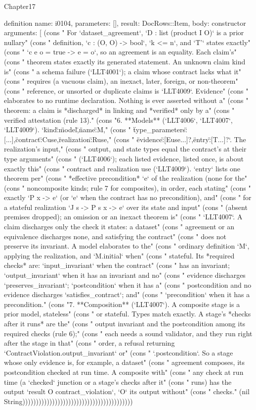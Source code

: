 \begin{lexlean}{Chapter17}
\begin{semanticmodule}
definition{
  name: i0104,
  parameters: [],
  result: DocRows::Item,
  body: constructor{
    arguments: [
      (cons "   For `dataset_agreement`, `D : list (product I O)` is a prior nullary" (cons "   definition, `c : (O, O) -> bool`, `k <= n`, and `T'` states exactly" (cons "   `c e o = true -> e = o`, so an agreement is an equality. Each claim's" (cons "   theorem states exactly its generated statement. An unknown claim kind is" (cons "   a schema failure (`LLT4001`); a claim whose contract lacks what it" (cons "   requires (a vacuous claim), an inexact, later, foreign, or non-theorem" (cons "   reference, or unsorted or duplicate claims is `LLT4009`. Evidence" (cons "   elaborates to no runtime declaration. Nothing is ever asserted without a" (cons "   theorem: a claim is *discharged* in linking and *verified* only by a" (cons "   verified attestation (rule 13)." (cons "6. **Models** (`LLT4006`, `LLT4007`, `LLT4009`). `{\"kind\":\"model\",\"name\":M," (cons "   \"type_parameters\":[...],\"contract\":Cuse,\"realization\":Ruse," (cons "   \"evidence\":[Euse...]?,\"entry\":[T...]?}`. The realization's input," (cons "   output, and state types equal the contract's at their type arguments" (cons "   (`LLT4006`); each listed evidence, listed once, is about exactly this" (cons "   contract and realization use (`LLT4009`). `entry` lists one theorem per" (cons "   *effective precondition* `e` of the realization (none for the" (cons "   noncomposite kinds; rule 7 for composites), in order, each stating" (cons "   exactly `P x -> e` (or `e` when the contract has no precondition), and" (cons "   for a stateful realization `J s -> P s x -> e` over its state and input" (cons "   (absent premises dropped); an omission or an inexact theorem is" (cons "   `LLT4007`. A claim discharges only the check it states: a dataset" (cons "   agreement or an equivalence discharges none, and satisfying the contract" (cons "   does not preserve its invariant. A model elaborates to the" (cons "   ordinary definition `M`, applying the realization, and `M.initial` when" (cons "   stateful. Its *required checks* are: `input_invariant` when the contract" (cons "   has an invariant; `output_invariant` when it has an invariant and no" (cons "   evidence discharges `preserves_invariant`; `postcondition` when it has a" (cons "   postcondition and no evidence discharges `satisfies_contract`; and" (cons "   `precondition` when it has a precondition." (cons "7. **Composition** (`LLT4007`). A composite stage is a prior model, stateless" (cons "   or stateful. Types match exactly. A stage's *checks after it runs* are the" (cons "   output invariant and the postcondition among its required checks (rule 6);" (cons "   each needs a sound validator, and they run right after the stage in that" (cons "   order, a refusal returning `ContractViolation.output_invariant` or" (cons "   `.postcondition`. So a stage whose only evidence is, for example, a dataset" (cons "   agreement composes, its postcondition checked at run time. A composite with" (cons "   any check at run time (a `checked` junction or a stage's checks after it" (cons "   runs) has the output `result O contract_violation`, `O` its output without" (cons "   checks." (nil String)))))))))))))))))))))))))))))))))))))))))
}}
\end{semanticmodule}
\end{lexlean}
